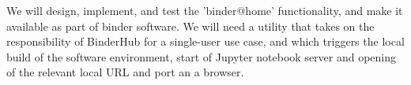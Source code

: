 \begin{task}
We will design, implement, and test the 'binder@home' functionality, and make it
available as part of binder software. We will need a utility that takes on
the responsibility of BinderHub for a single-user use case, and which triggers
the local build of the software environment, start of Jupyter notebook
server and opening of the relevant local URL and port an a browser.


\end{task}
